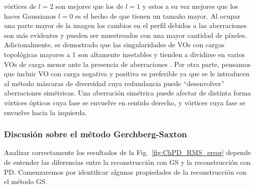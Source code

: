 vórtices de $l=2$ son mejores que los de $l=1$ y estos a su vez
mejores que los haces Gaussianos $l=0$ es el hecho de que tienen un
tamaño mayor. Al ocupar una parte mayor de la imagen los cambios en el
perfil debidos a las aberraciones son más evidentes y pueden ser
muestreados con una mayor cantidad de píxeles. Adicionalmente, se
demostrado que las
singularidades de VOs con cargas topológicas mayores a 1 son altamente
inestables y tienden a
dividirse en varios VOs de carga menor ante la presencia de
aberraciones . Por otra parte, pensamos que 
incluir VO con carga negativa y positiva es preferible ya que se le
introducen al método máscaras de diversidad cuya redundancia puede ``desenvolver''
aberraciones simétricas. Una aberración simétrica puede afectar de
distinta forma vórtices ópticos cuya fase se envuelve en sentido
derecho, y vórtices cuya fase se envuelve hacia la izquierda.

\subsubsection{Discusión sobre el método Gerchberg-Saxton}
Analizar correctamente los resultados de la Fig.~\ref{fig:ChPD_RMS_error} depende de entender las diferencias entre la
reconstrucción con GS y la reconstrucción con PD. Comenzaremos por
identificar algunas propiedades de la reconstrucción con el método GS.

